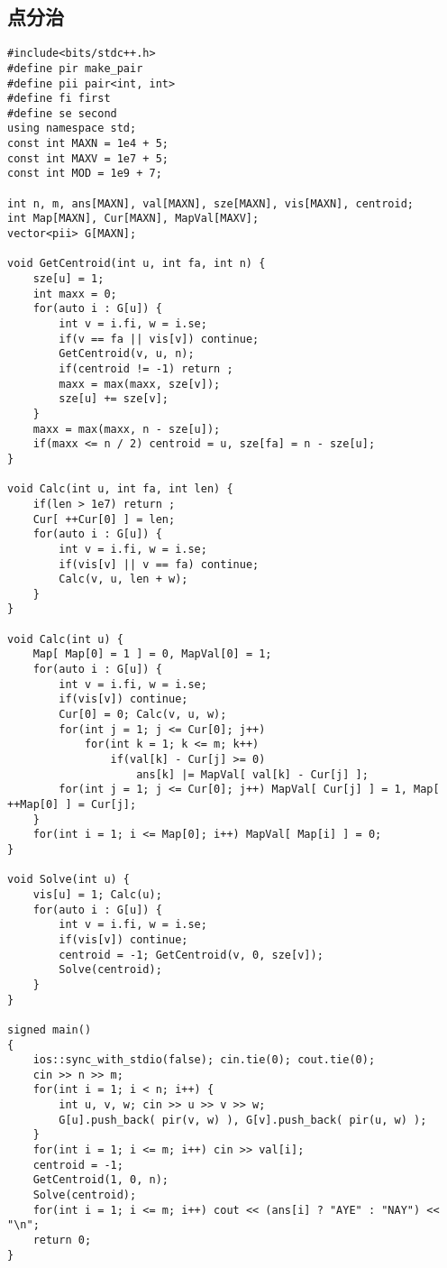 \subsection{点分治}
\begin{lstlisting}
#include<bits/stdc++.h>
#define pir make_pair
#define pii pair<int, int>
#define fi first
#define se second
using namespace std;
const int MAXN = 1e4 + 5;
const int MAXV = 1e7 + 5;
const int MOD = 1e9 + 7;

int n, m, ans[MAXN], val[MAXN], sze[MAXN], vis[MAXN], centroid;
int Map[MAXN], Cur[MAXN], MapVal[MAXV];
vector<pii> G[MAXN];

void GetCentroid(int u, int fa, int n) {
	sze[u] = 1;
	int maxx = 0;
	for(auto i : G[u]) {
		int v = i.fi, w = i.se;
		if(v == fa || vis[v]) continue;
		GetCentroid(v, u, n);
		if(centroid != -1) return ;
		maxx = max(maxx, sze[v]);
		sze[u] += sze[v];
	}
	maxx = max(maxx, n - sze[u]);
	if(maxx <= n / 2) centroid = u, sze[fa] = n - sze[u];
}

void Calc(int u, int fa, int len) {
	if(len > 1e7) return ;
	Cur[ ++Cur[0] ] = len;
	for(auto i : G[u]) {
		int v = i.fi, w = i.se;
		if(vis[v] || v == fa) continue;
		Calc(v, u, len + w);
	}
}

void Calc(int u) {
	Map[ Map[0] = 1 ] = 0, MapVal[0] = 1;
	for(auto i : G[u]) {
		int v = i.fi, w = i.se;
		if(vis[v]) continue;
		Cur[0] = 0; Calc(v, u, w);
		for(int j = 1; j <= Cur[0]; j++) 
			for(int k = 1; k <= m; k++) 
				if(val[k] - Cur[j] >= 0) 
					ans[k] |= MapVal[ val[k] - Cur[j] ];
		for(int j = 1; j <= Cur[0]; j++) MapVal[ Cur[j] ] = 1, Map[ ++Map[0] ] = Cur[j];
	}
	for(int i = 1; i <= Map[0]; i++) MapVal[ Map[i] ] = 0;
}

void Solve(int u) {
	vis[u] = 1; Calc(u);
	for(auto i : G[u]) {
		int v = i.fi, w = i.se;
		if(vis[v]) continue;
		centroid = -1; GetCentroid(v, 0, sze[v]);
		Solve(centroid);
	}
}

signed main()
{
	ios::sync_with_stdio(false); cin.tie(0); cout.tie(0);
	cin >> n >> m;
	for(int i = 1; i < n; i++) {
		int u, v, w; cin >> u >> v >> w;
		G[u].push_back( pir(v, w) ), G[v].push_back( pir(u, w) );
	}
	for(int i = 1; i <= m; i++) cin >> val[i];
	centroid = -1;
	GetCentroid(1, 0, n);
	Solve(centroid);
	for(int i = 1; i <= m; i++) cout << (ans[i] ? "AYE" : "NAY") << "\n";
	return 0;
}
\end{lstlisting}

